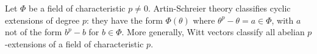 Let $\Phi$ be a field of characteristic $p \neq 0$. Artin-Schreier theory classifies cyclic extensions of degree $p$: they have the form $\Phi(\theta)$ where $\theta^p - \theta = a \in \Phi$, with $a$ not of the form $b^p - b$ for $b \in \Phi$. More generally, Witt vectors classify all abelian $p$-extensions of a field of characteristic $p$.
